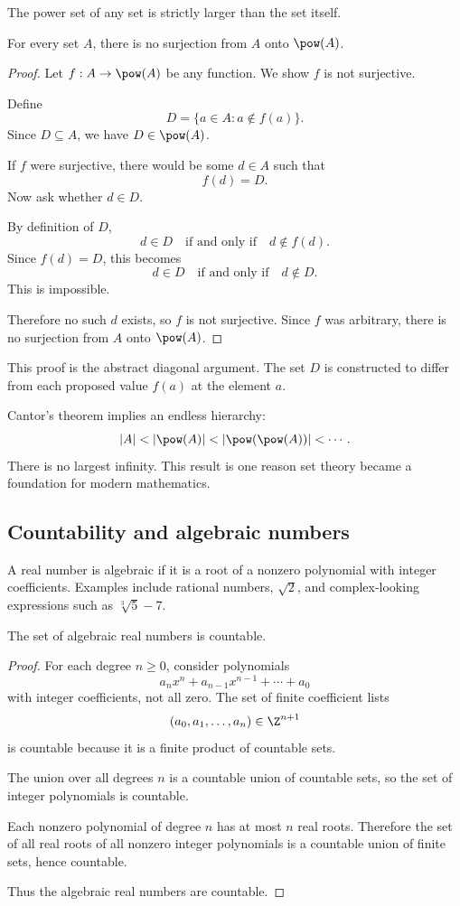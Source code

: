 The power set of any set is strictly larger than the set itself.

\begin{theorem}[Cantor]
For every set $A$, there is no surjection from $A$ onto $\pow(A)$.
\end{theorem}

\begin{proof}
Let $f:A\to\pow(A)$ be any function. We show $f$ is not surjective.

Define
\[
D=\{a\in A:a\notin f(a)\}.
\]
Since $D\subseteq A$, we have $D\in\pow(A)$.

If $f$ were surjective, there would be some $d\in A$ such that
\[
f(d)=D.
\]
Now ask whether $d\in D$.

By definition of $D$,
\[
d\in D\quad\text{if and only if}\quad d\notin f(d).
\]
Since $f(d)=D$, this becomes
\[
d\in D\quad\text{if and only if}\quad d\notin D.
\]
This is impossible.

Therefore no such $d$ exists, so $f$ is not surjective. Since $f$ was arbitrary, there is no surjection from $A$ onto $\pow(A)$.
\end{proof}

This proof is the abstract diagonal argument. The set $D$ is constructed to differ from each proposed value $f(a)$ at the element $a$.

\begin{historybox}
Cantor's theorem implies an endless hierarchy:
\[
|A|<|\pow(A)|<|\pow(\pow(A))|<\cdots.
\]
There is no largest infinity. This result is one reason set theory became a foundation for modern mathematics.
\end{historybox}

\subsection{Countability and algebraic numbers}

A real number is algebraic if it is a root of a nonzero polynomial with integer coefficients. Examples include rational numbers, $\sqrt2$, and complex-looking expressions such as $\sqrt[3]{5}-7$.

\begin{theorem}
The set of algebraic real numbers is countable.
\end{theorem}

\begin{proof}
For each degree $n\geq0$, consider polynomials
\[
a_nx^n+a_{n-1}x^{n-1}+\cdots+a_0
\]
with integer coefficients, not all zero. The set of finite coefficient lists
\[
(a_0,a_1,\ldots,a_n)\in\Z^{n+1}
\]
is countable because it is a finite product of countable sets.

The union over all degrees $n$ is a countable union of countable sets, so the set of integer polynomials is countable.

Each nonzero polynomial of degree $n$ has at most $n$ real roots. Therefore the set of all real roots of all nonzero integer polynomials is a countable union of finite sets, hence countable.

Thus the algebraic real numbers are countable.
\end{proof}

